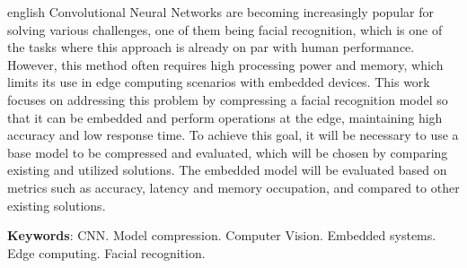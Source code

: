 \setlength{\absparsep}{18pt} %
\begin{resumo}[Abstract]
 \begin{otherlanguage*}{english}
   Convolutional Neural Networks are becoming increasingly popular for solving various challenges, one of them being facial
   recognition, which is one of the tasks where this approach is already on par with human performance.
   However, this method often requires high processing power and memory, which limits its use in edge computing scenarios
   with embedded devices.
   This work focuses on addressing this problem by compressing a facial recognition model so that it can be embedded and
   perform operations at the edge, maintaining high accuracy and low response time.
   To achieve this goal, it will be necessary to use a base model to be compressed and evaluated, which will be chosen by
   comparing existing and utilized solutions. The embedded model will be evaluated based on metrics such as accuracy,
   latency and memory occupation, and compared to other existing solutions.

   \vspace{\onelineskip}

   \noindent
   \textbf{Keywords}: CNN. Model compression. Computer Vision. Embedded systems. Edge computing. Facial recognition.
 \end{otherlanguage*}
\end{resumo}
